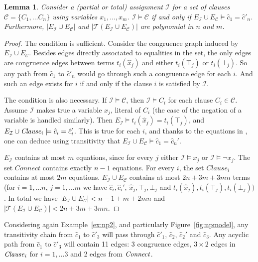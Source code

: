 \documentclass{easychair}
\newtheorem{lemma}{Lemma}
\begin{document}
\begin{lemma}
\label{lemma:eqv}
Consider a (partial or total) assignment $\mathcal{I}$ for a set of clauses
$\mathcal{C}= \{C_1, \dots C_n\}$ using variables $x_1,\ldots, x_m$.  $\mathcal{I} \models \mathcal{C}$ if and only if
$E_{\mathcal{I}} \cup E_\mathcal{C} \models \hat{c}_1 = \hat{c}'_n$.
Furthermore, $|E_{\mathcal{I}} \cup E_\mathcal{C}|$ and $|\mathcal{T}(E_{\mathcal{I}} \cup E_\mathcal{C})|$ are polynomial in $n$ and $m$.
\end{lemma}
\begin{proof}
The condition is sufficient.  Consider the congruence graph induced by
$E_{\mathcal{I}} \cup E_\mathcal{C}$.  Besides edges directly associated to
equalities in the set, the only edges are congruence edges between terms
$t_i(\hat{x}_j)$ and either $t_i(\top_j)$ or $t_i(\bot_j)$.  So any path from
$\hat{c}_1$ to $\hat{c}'_n$ would go through such a congruence edge for each $i$.
And such an edge exists for $i$ if and only if the clause $i$ is satisfied by
$\mathcal{I}$.

The condition is also necessary.  If $\mathcal{I} \models \mathcal{C}$, then
$\mathcal{I} \models C_i$ for each clause $C_i \in \mathcal{C}$.  Assume
$\mathcal{I}$ makes true a variable $x_j$, literal of $C_i$ (the case of
the negation of a variable is handled similarly).  Then $E_{\mathcal{I}} \models
t_i(\hat{x}_j) = t_i(\top_j)$, and $E_{\mathcal{I}} \cup {\it Clause}_i
\models \hat{c}_i = \hat{c}_i'$.  This is true for each $i$, and
thanks to the equations in \Connect, one can deduce using transitivity that
$E_{\mathcal{I}} \cup E_\mathcal{C} \models \hat{c}_1 = \hat{c}_n'$.

$E_{\mathcal{I}}$ contains at most $m$ equations, since for every $j$ either $\mathcal{I} \models x_j$ or $\mathcal{I} \models \neg x_j$.
The set $Connect$ contains exactly $n-1$ equations.
For every $i$, the set $Clause_i$ contains at most $2m$ equations.
$E_{\mathcal{I}} \cup E_\mathcal{C}$ contains at most $2n + 3m + 3mn$ terms (for $i = 1,\ldots n$, $j = 1,\ldots m$ we have $\hat{c}_i,\hat{c}_i'$, $\hat{x}_j,\top_j,\bot_j$ and $t_i(\hat{x}_j),t_i(\top_j),t_i(\bot_j))$.
In total we have $|E_{\mathcal{I}} \cup E_\mathcal{C}| < n-1 + m + 2mn$ and $|\mathcal{T}(E_{\mathcal{I}} \cup E_\mathcal{C})| < 2n + 3m + 3mn$.
\end{proof}

\noindent 
Considering again Example~\ref{ex:np2}, and particularly
Figure~\ref{fig:npmodel}, any transitivity chain from $\hat{c}_1$ to
$\hat{c}'_3$ will pass through $\hat{c}'_1$, $\hat{c}_2$, $\hat{c}_2'$ and
$\hat{c}_3$.  Any acyclic path from $\hat{c}_1$ to $\hat{c}'_3$ will contain 11
edges: 3 congruence edges, $3\times 2$ edges in ${\it Clause}_i$ for $i=1,\dots 3$
and 2 edges from ${\it Connect}$.
\end{document}
